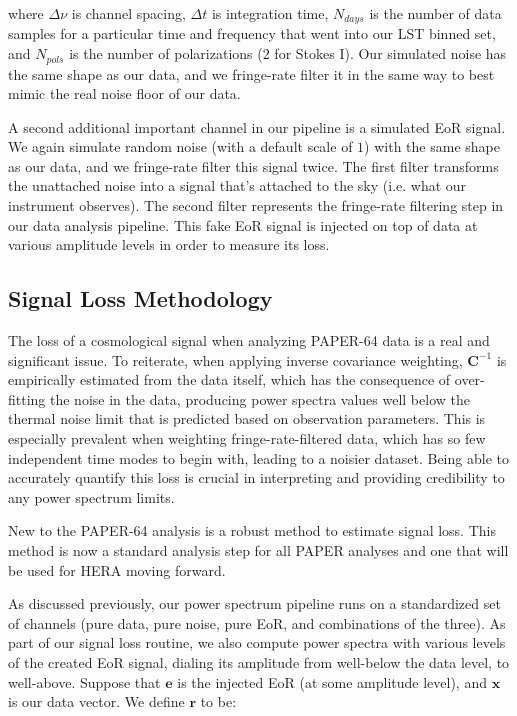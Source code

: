 \documentclass[preprint2,numberedappendix,tighten,twocolappendix]{aastex6}  %
\begin{document}
where $\Delta\nu$ is channel spacing, $\Delta t$ is integration time, $N_{days}$ is the number of data samples for a particular time and frequency that went into our LST binned set, and $N_{pols}$ is the number of polarizations ($2$ for Stokes I). Our simulated noise has the same shape as our data, and we fringe-rate filter it in the same way to best mimic the real noise floor of our data. 

A second additional important channel in our pipeline is a simulated EoR signal. We again simulate random noise (with a default scale of $1$) with the same shape as our data, and we fringe-rate filter this signal twice. The first filter transforms the unattached noise into a signal that's attached to the sky (i.e. what our instrument observes). The second filter represents the fringe-rate filtering step in our data analysis pipeline. This fake EoR signal is injected on top of data at various amplitude levels in order to measure its loss.

\subsection{Signal Loss Methodology} 

The loss of a cosmological signal when analyzing PAPER-64 data is a real and significant issue. To reiterate, when applying inverse covariance weighting, $\textbf{C}^{-1}$ is empirically estimated from the data itself, which has the consequence of over-fitting the noise in the data, producing power spectra values well below the thermal noise limit that is predicted based on observation parameters. This is especially prevalent when weighting fringe-rate-filtered data, which has so few independent time modes to begin with, leading to a noisier dataset. Being able to accurately quantify this loss is crucial in interpreting and providing credibility to any power spectrum limits. 

New to the PAPER-64 analysis is a robust method to estimate signal loss. This method is now a standard analysis step for all PAPER analyses and one that will be used for HERA moving forward.

As discussed previously, our power spectrum pipeline runs on a standardized set of channels (pure data, pure noise, pure EoR, and combinations of the three). As part of our signal loss routine, we also compute power spectra with various levels of the created EoR signal, dialing its amplitude from well-below the data level, to well-above. Suppose that $\textbf{e}$ is the injected EoR (at some amplitude level), and $\textbf{x}$ is our data vector. We define $\textbf{r}$ to be:
\end{document}
